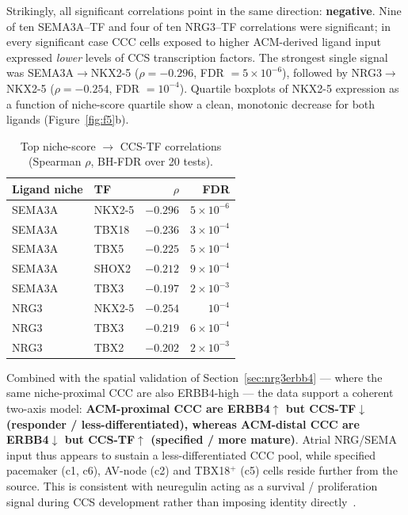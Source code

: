 \documentclass[11pt,a4paper]{article}
\begin{document}
Strikingly, all significant correlations point in the same direction:
\textbf{negative}. Nine of ten SEMA3A--TF and four of ten NRG3--TF
correlations were significant; in every significant case CCC cells
exposed to higher ACM-derived ligand input expressed \emph{lower}
levels of CCS transcription factors. The strongest single signal was
SEMA3A$\to$NKX2-5 ($\rho{=}-0.296$, FDR ${=}5\times 10^{-6}$), followed
by NRG3$\to$NKX2-5 ($\rho{=}-0.254$, FDR $=10^{-4}$). Quartile boxplots
of NKX2-5 expression as a function of niche-score quartile show a
clean, monotonic decrease for both ligands
(Figure~\ref{fig:f5}b).

\begin{table}[H]
\centering
\caption{Top niche-score $\to$ CCS-TF correlations
(Spearman $\rho$, BH-FDR over 20 tests).}
\label{tab:niche}
\small
\begin{tabular}{llrr}
\toprule
Ligand niche & TF & $\rho$ & FDR \\
\midrule
SEMA3A & NKX2-5 & $-0.296$ & $5\times 10^{-6}$ \\
SEMA3A & TBX18  & $-0.236$ & $3\times 10^{-4}$ \\
SEMA3A & TBX5   & $-0.225$ & $5\times 10^{-4}$ \\
SEMA3A & SHOX2  & $-0.212$ & $9\times 10^{-4}$ \\
SEMA3A & TBX3   & $-0.197$ & $2\times 10^{-3}$ \\
NRG3   & NKX2-5 & $-0.254$ & $10^{-4}$ \\
NRG3   & TBX3   & $-0.219$ & $6\times 10^{-4}$ \\
NRG3   & TBX2   & $-0.202$ & $2\times 10^{-3}$ \\
\bottomrule
\end{tabular}
\end{table}

Combined with the spatial validation of Section~\ref{sec:nrg3erbb4} ---
where the same niche-proximal CCC are also ERBB4-high --- the data
support a coherent two-axis model: \textbf{ACM-proximal CCC are
ERBB4$\uparrow$ but CCS-TF$\downarrow$ (responder / less-differentiated),
whereas ACM-distal CCC are ERBB4$\downarrow$ but CCS-TF$\uparrow$
(specified / more mature)}. Atrial NRG/SEMA input thus appears to
sustain a less-differentiated CCC pool, while specified pacemaker (c1,
c6), AV-node (c2) and TBX18$^+$ (c5) cells reside further from the
source. This is consistent with neuregulin acting as a survival /
proliferation signal during CCS development rather than imposing
identity directly~\citep{rentschler2002nrg1ccs}.
\end{document}
